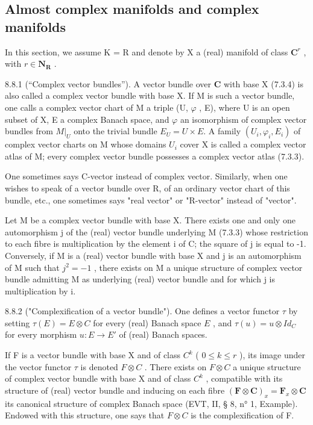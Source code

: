 \subsection{Almost complex manifolds and complex manifolds}

In this section, we assume K = R and denote by X a (real) manifold of class \(\mathbf{C}^{r}\) , with \(r \in \mathbf{N}_{\mathbf{R}}\) .

8.8.1 (“Complex vector bundles”). A vector bundle over \(\mathbf{C}\) with base X (7.3.4) is also called a complex vector bundle with base X. If M is such a vector bundle, one calls a complex vector chart of M a triple (U, \(\varphi\) , E), where U is an open subset of X, E a complex Banach space, and \(\varphi\) an isomorphism of complex vector bundles from \(M|_U\) onto the trivial bundle \(E_U = U \times E\). A family \((U_i,\varphi_i,E_i)\) of complex vector charts on M whose domains \(U_i\) cover X is called a complex vector atlas of M; every complex vector bundle possesses a complex vector atlas (7.3.3).

One sometimes says C-vector instead of complex vector. Similarly, when one wishes to speak of a vector bundle over R, of an ordinary vector chart of this bundle, etc., one sometimes says "real vector" or "R-vector" instead of "vector".

Let M be a complex vector bundle with base X. There exists one and only one automorphism j of the (real) vector bundle underlying M (7.3.3) whose restriction to each fibre is multiplication by the element i of C; the square of j is equal to -1. Conversely, if M is a (real) vector bundle with base X and j is an automorphism of M such that \(j^{2} = -1\) , there exists on M a unique structure of complex vector bundle admitting M as underlying (real) vector bundle and for which j is multiplication by i.

8.8.2 ("Complexification of a vector bundle"). One defines a vector functor \(\tau\) by setting \(\tau(E) = E \otimes C\) for every (real) Banach space \(E\) , and \(\tau(u) = u \otimes Id_{C}\) for every morphism \(u: E \to E'\) of (real) Banach spaces.

If F is a vector bundle with base X and of class \(C^{k}\) ( \(0 \leqslant k \leqslant r\) ), its image under the vector functor \(\tau\) is denoted \(F \otimes C\) . There exists on \(F \otimes C\) a unique structure of complex vector bundle with base X and of class \(C^{k}\) , compatible with its structure of (real) vector bundle and inducing on each fibre \((\mathbf{F} \otimes \mathbf{C})_{x} = \mathbf{F}_{x} \otimes \mathbf{C}\) its canonical structure of complex Banach space (EVT, II, § 8, n° 1, Example). Endowed with this structure, one says that \(F \otimes C\) is the complexification of F.

